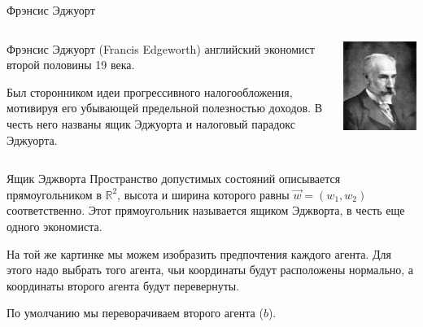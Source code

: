 \documentclass{beamer}
\begin{document}
\begin{frame}{Фрэнсис Эджуорт}
\begin{columns}
\begin{column}{0.5\textwidth}
   \alert{Фрэнсис Эджуорт} (Francis Edgeworth) английский экономист второй половины 19 века. 
   
  Был сторонником идеи прогрессивного налогообложения, мотивируя его убывающей предельной полезностью доходов. В честь него названы ящик Эджуорта и налоговый парадокс Эджуорта.
\end{column}
\begin{column}{0.5\textwidth}  %
    \begin{center}
     \includegraphics[width=1\textwidth]{Edgeworth}
     \end{center}
\end{column}
\end{columns}
\end{frame}

\begin{frame}{Ящик Эджворта}
Пространство допустимых состояний описывается прямоугольником в $\mathbb{R}^2$, высота и ширина которого равны $\vec w = (w_1,w_2)$ соответственно. Этот прямоугольник называется \alert{ящиком Эджворта}, в честь еще одного экономиста.

На той же картинке мы можем изобразить предпочтения каждого агента. Для этого надо выбрать того агента, чьи координаты будут расположены нормально, а координаты второго агента будут перевернуты. 

По умолчанию мы переворачиваем второго агента ($b$).
\end{frame}
\end{document}
